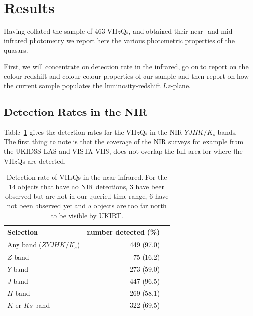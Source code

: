 \documentclass[usenatbib]{mnras}
\begin{document}
\begin{landscape}
      
\end{landscape}



\section{Results}
Having collated the sample of 463 VH$z$Qs, and obtained their near-
and mid-infrared photometry we report here the various photometric
properties of the quasars.

First, we will concentrate on detection rate in the infrared, go on to
report on the colour-redshift and colour-colour properties of our sample
and then report on how the current sample populates the
luminosity-redshift $Lz$-plane.

\subsection{Detection Rates in the NIR}
Table~\ref{tab:nir_detection} gives the detection rates for the 
VH$z$Qs in the NIR $YJHK/K_{s}$-bands. 
The first thing to note is that the coverage of the NIR surveys 
for example from the UKIDSS LAS and VISTA VHS, does
not overlap the full area for where the VH$z$Qs are detected. 

\begin{table}
  \centering
  \begin{tabular}{l r l}
    \hline  \hline
    Selection   & number detected (\%) \\
    \hline  
    Any band ($ZYJHK/K_{s}$)    &  449  (97.0) \\
    $Z$-band                            &  75  (16.2) \\
    $Y$-band                            &  273  (59.0) \\
    $J$-band                              &  447  (96.5) \\
    $H$-band                            &  269  (58.1) \\
    $K$ or $Ks$-band                &  322  (69.5) \\
    \hline  \hline
  \end{tabular}
  \caption{Detection rate of VH$z$Qs in the near-infrared. 
For the 14 objects that have no NIR detections, 3 have 
been observed but are not in our queried time range, 6 have 
not been observed yet and 5 objects are too far north to be visible 
by UKIRT. }
  \label{tab:nir_detection}
\end{table}
\end{document}
